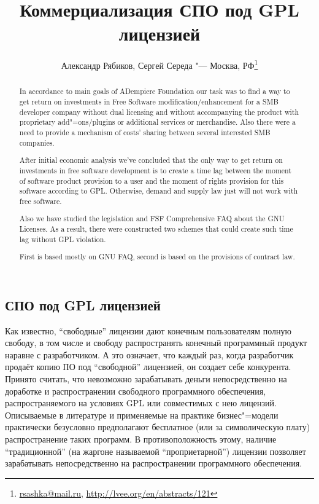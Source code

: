 \documentclass[10pt, a5paper]{article}
\begin{document}
\title{Коммерциализация СПО под GPL лицензией}
\author{Александр Рябиков, Сергей Середа "--- Москва, РФ\footnote{\url{rsashka@mail.ru}, \url{http://lvee.org/en/abstracts/121}}}
\maketitle
\begin{abstract}
In accordance to main goals of ADempiere Foundation our task was to find a way to get return on investments in Free Software modification/enhancement for a SMB developer company without dual licensing and without accompanying the product with proprietary add"=ons/plugins or additional services or merchandise. Also there were a need to provide a mechanism of costs' sharing between several interested SMB companies.

After initial economic analysis we've concluded that the only way to get return on investments in free software development is to create a time lag between the moment of software product provision to a user and the moment of rights provision for this software according to GPL. Otherwise, demand and supply law just will not work with free software.

Also we have studied the legislation and FSF Comprehensive FAQ about the GNU Licenses. As a result, there were constructed two schemes that could create such time lag without GPL violation. 

First is based mostly on GNU FAQ, second is based on the provisions of contract law.
\end{abstract}


\subsection*{СПО под GPL лицензией}

Как известно, “свободные” лицензии дают конечным пользователям полную свободу, в том числе и свободу распространять конечный программный продукт наравне с разработчиком. А это означает, что каждый раз, когда разработчик продаёт копию ПО под “свободной” лицензией, он создает себе конкурента. Принято считать, что невозможно зарабатывать деньги непосредственно на доработке и распространении свободного программного обеспечения, распространяемого на условиях GPL или совместимых с нею лицензий. Описываемые в литературе и применяемые на практике бизнес"=модели практически безусловно предполагают бесплатное (или за символическую плату) распространение таких программ. В противоположность этому, наличие “традиционной” (на жаргоне называемой “проприетарной”) лицензии позволяет зарабатывать непосредственно на распространении программного обеспечения.
\end{document}
